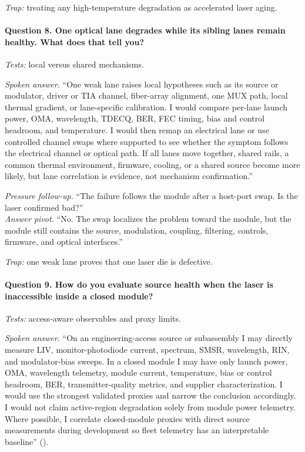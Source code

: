\textit{Trap:} treating any high-temperature degradation as accelerated laser
aging.

\paragraph{Question 8. One optical lane degrades while its sibling lanes remain
healthy. What does that tell you?}
\textit{Tests:} local versus shared mechanisms.

\textit{Spoken answer.}
``One weak lane raises local hypotheses such as its source or modulator, driver
or TIA channel, fiber-array alignment, one MUX path, local thermal gradient, or
lane-specific calibration. I would compare per-lane launch power, OMA,
wavelength, TDECQ, BER, FEC timing, bias and control headroom, and temperature.
I would then remap an electrical lane or use controlled channel swaps where
supported to see whether the symptom follows the electrical channel or optical
path. If all lanes move together, shared rails, a common thermal environment,
firmware, cooling, or a shared source become more likely, but lane correlation
is evidence, not mechanism confirmation.''

\textit{Pressure follow-up.} ``The failure follows the module after a host-port
swap. Is the laser confirmed bad?''\\
\textit{Answer pivot.} ``No. The swap localizes the problem toward the module,
but the module still contains the source, modulation, coupling, filtering,
controls, firmware, and optical interfaces.''

\textit{Trap:} one weak lane proves that one laser die is defective.

\paragraph{Question 9. How do you evaluate source health when the laser is
inaccessible inside a closed module?}
\textit{Tests:} access-aware observables and proxy limits.

\textit{Spoken answer.}
``On an engineering-access source or subassembly I may directly measure LIV,
monitor-photodiode current, spectrum, SMSR, wavelength, RIN, and modulator-bias
sweeps. In a closed module I may have only launch power, OMA, wavelength
telemetry, module current, temperature, bias or control headroom, BER,
transmitter-quality metrics, and supplier characterization. I would use the
strongest validated proxies and narrow the conclusion accordingly. I would not
claim active-region degradation solely from module power telemetry. Where
possible, I correlate closed-module proxies with direct source measurements
during development so fleet telemetry has an interpretable baseline''
().

